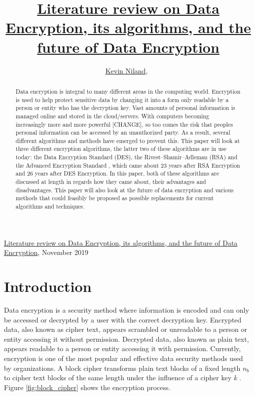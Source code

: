 \documentclass[journal]{IEEEtran}
\begin{document}
%
{\href{https://github.com/kevinniland97/Literature-review-on-Data-Encryption-algorithm}{Literature review on Data Encryption, its algorithms, and the future of Data Encryption}, November 2019}

\title{\href{https://github.com/kevinniland97/Literature-review-on-Data-Encryption-algorithms}{Literature review on Data Encryption, its algorithms, and the future of Data Encryption}}
\author{\href{https://github.com/kevinniland97}{Kevin Niland},~}
\maketitle

\begin{abstract}
Data encryption is integral to many different areas in the computing world. Encryption is used to help protect sensitive data by changing it into a form only readable by a person or entity who has the decryption key. Vast amounts of personal information is managed online and stored in the cloud/servers. With computers becoming increasingly more and more powerful [CHANGE], so too comes the risk that peoples personal information can be accessed by an unauthorized party. As a result, several different algorithms and methods have emerged to prevent this. This paper will look at three different encryption algorithms, the latter two of these algorithms are in use today: the Data Encryption Standard (DES), the Rivest–Shamir–Adleman (RSA) \cite{RSA} and the Advanced Encryption Standard \cite{AES}, which came about 23 years after RSA Encryption and 26 years after DES Encryption. In this paper, both of these algorithms are discussed at length in regards how they came about, their advantages and disadvantages. This paper will also look at the future of data encryption and various methods that could feasibly be proposed as possible replacements for current algorithms and techniques. 
\end{abstract}

\section{\textbf{Introduction}}
Data encryption is a security method where information is encoded and can only be accessed or decrypted by a user with the correct decryption key. Encrypted data, also known as cipher text, appears scrambled or unreadable to a person or entity accessing it without permission. Decrypted data, also known as plain text, appears readable to a person or entity accessing it with permission. Currently, encryption is one of the most popular and effective data security methods used by organizations. A block cipher transforms plain text blocks of a fixed length \textit{${n_b}$} to cipher text blocks of the same length under the influence of a cipher key \textit{k} \cite{block_cipher}. Figure \ref{fig:block_cipher} shows the encryption process.
\end{document}
